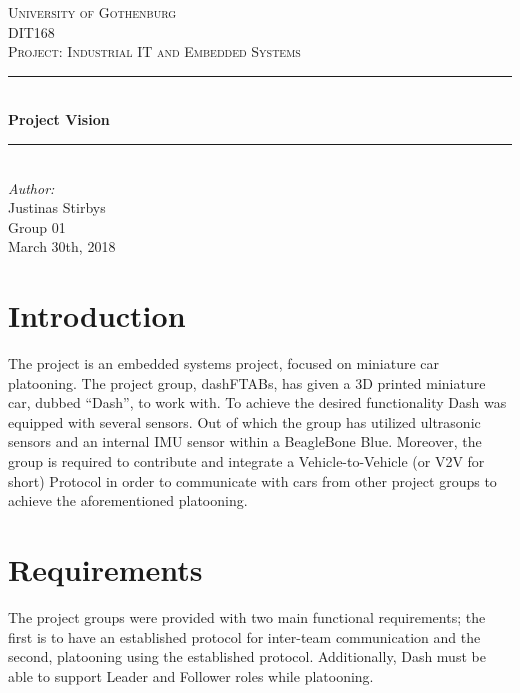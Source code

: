 \documentclass[12pt]{article}
\begin{document}
\begin{titlepage}

\newcommand{\Line}{\rule{\linewidth}{0.5mm}} 

\center
 
\textsc{\LARGE University of Gothenburg}
\\[3.5cm] 

\textsc{\Large DIT168}\\[0.3cm]
\textsc{\large Project: Industrial IT and Embedded Systems}\\[0.5cm]

\Line \\[0.4cm]
{\huge \bfseries Project Vision}\\[0.4cm]
\Line \\[0.5cm]
 
\Large \textit{Author:}
\\Justinas Stirbys \\[7cm]

{\large Group 01} \\[0.3cm]
{\large March 30th, 2018}

\vfill

\end{titlepage}


\section{Introduction} 
The project is an embedded systems project, focused on miniature car platooning. The project group, dashFTABs, has given a 3D printed miniature car, dubbed “Dash”, to work with. To achieve the desired functionality Dash was equipped with several sensors. Out of which the group has utilized ultrasonic sensors and an internal IMU sensor within a BeagleBone Blue. Moreover, the group is required to contribute and integrate a Vehicle-to-Vehicle (or V2V for short) Protocol in order to communicate with cars from other project groups to achieve the aforementioned platooning.

\section{Requirements}
The project groups were provided with two main functional requirements; the first is to have an established protocol for inter-team communication and the second, platooning using the established protocol. Additionally, Dash must be able to support Leader and Follower roles while platooning. \par
\end{document}
